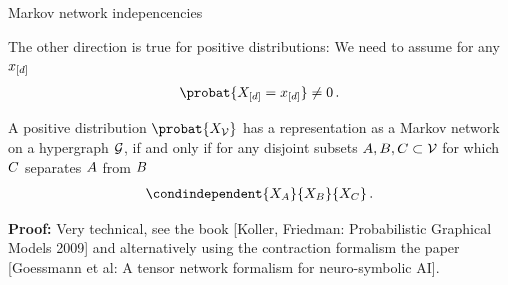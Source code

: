 \documentclass{beamer}
\begin{document}
    \begin{frame}{Markov network indepencencies}

        The other direction is true for positive distributions: We need to assume for any $x_{[d]}$
        \begin{align*}
            \probat{\indexedshortcatvariables}\neq 0 \, .
        \end{align*}

        \begin{theorem}
            A positive distribution $\probat{\nodevariables}$ has a representation as a Markov network on a hypergraph $\mathcal{G}$, if and only if for any disjoint subsets $A,B,C\subset\mathcal{V}$ for which $C$ separates $A$ from $B$
            \begin{align*}
                \condindependent{\catvariableof{\nodesa}}{\catvariableof{\nodesb}}{\catvariableof{\nodesc}} \, .
            \end{align*}
        \end{theorem}
            {\bf Proof:} Very technical, see the book [Koller, Friedman: Probabilistic Graphical Models 2009] and alternatively using the contraction formalism the paper [Goessmann et al: A tensor network formalism for neuro-symbolic AI].
    \end{frame}
\end{document}
